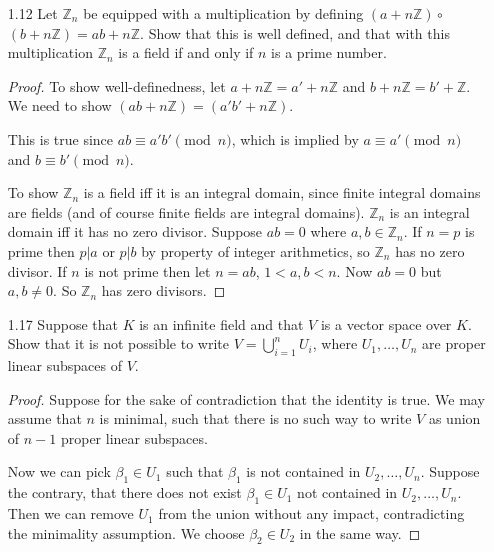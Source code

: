 \begin{itemize}
\begin{proof}
	On the other hand, if $(x, n) = a \neq 1$, then $a | x$. Thus $n | \frac{n}{a} x$. This means the order of cyclic group generated by $x$ is no more than $n / a$. Hence $x$ cannot generate $\mathbb{Z}_n$ since there's not enough elements in $\left\langle x \right\rangle $.
\end{proof}

	\item [1.12] Let $\mathbb{Z}_n$ be equipped with a multiplication by defining $(a+n \mathbb{Z}) \circ$ $(b+n \mathbb{Z})=a b+n \mathbb{Z}$. Show that this is well defined, and that with this multiplication $\mathbb{Z}_n$ is a field if and only if $n$ is a prime number.
\begin{proof}


To show well-definedness, let  $a + n\mathbb{Z} = a' + n\mathbb{Z}$ and $b + n \mathbb{Z} = b' +  \mathbb{Z}$. We need to show $(ab+ n \mathbb{Z}) = (a'b' + n \mathbb{Z})$.

This is true since $ab \equiv a'b' \pmod n$, which is implied by $a \equiv a' \pmod n$ and $b \equiv b' \pmod n$.

To show $\mathbb{Z}_n$ is a field iff it is an integral domain, since finite integral domains are fields (and of course finite fields are integral domains). $\mathbb{Z}_n$ is an integral domain iff it has no zero divisor. Suppose $ab = 0$ where $a, b \in \mathbb{Z}_n$. If $n = p$ is prime then $p| a$ or $p | b$ by property of integer arithmetics, so $\mathbb{Z}_n$ has no zero divisor. If $n$ is not prime then let $n = a b$, $1 <a, b < n$. Now $ab = 0$ but $a, b \neq 0$. So $\mathbb{Z}_n$ has zero divisors.

\end{proof}

	\item [1.17] Suppose that $K$ is an infinite field and that $V$ is a vector space over $K$. Show that it is not possible to write $V=\bigcup_{i=1}^n U_i$, where $U_1, \ldots, U_n$ are proper linear subspaces of $V$.
\begin{proof}
	Suppose for the sake of contradiction that the identity is true. We may assume that $n$ is minimal, such that there is no such way to write $V$ as union of $n - 1$ proper linear subspaces.

	Now we can pick $\beta_1 \in U_1$ such that $\beta_1$ is not contained in $U_2,\ldots, U_n$. Suppose the contrary, that there does not exist  $\beta_1 \in U_1$ not contained in $U_2, \ldots, U_n$. Then we can remove $U_1$ from the union without any impact, contradicting the minimality assumption. We choose $\beta_2 \in U_2$ in the same way.


\end{proof}
\end{itemize}
